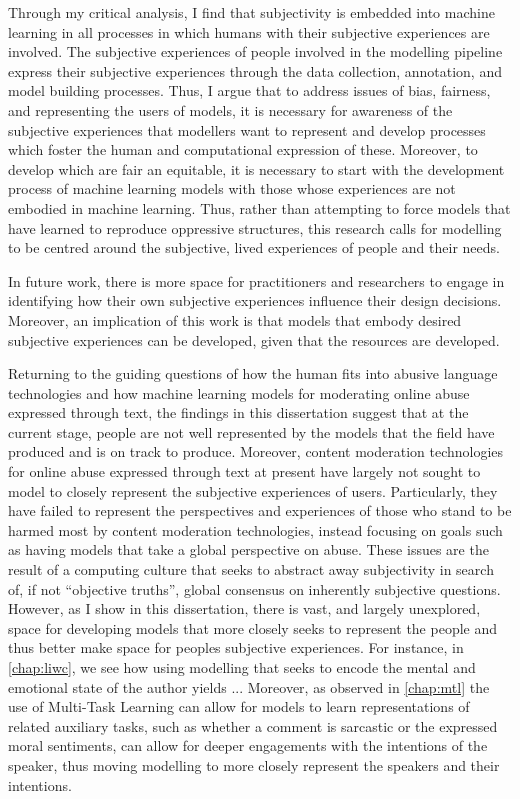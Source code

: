 Through my critical analysis, I find that subjectivity is embedded into machine learning in all processes in which humans with their subjective experiences are involved.
The subjective experiences of people involved in the modelling pipeline express their subjective experiences through the data collection, annotation, and model building processes.
Thus, I argue that to address issues of bias, fairness, and representing the users of models, it is necessary for awareness of the subjective experiences that modellers want to represent and develop processes which foster the human and computational expression of these.
Moreover, to develop which are fair an equitable, it is necessary to start with the development process of machine learning models with those whose experiences are not embodied in machine learning.
Thus, rather than attempting to force models that have learned to reproduce oppressive structures, this research calls for modelling to be centred around the subjective, lived experiences of people and their needs.

In future work, there is more space for practitioners and researchers to engage in identifying how their own subjective experiences influence their design decisions.
Moreover, an implication of this work is that models that embody desired subjective experiences can be developed, given that the resources are developed.

Returning to the guiding questions of how the human fits into abusive language technologies and how machine learning models for moderating online abuse expressed through text, the findings in this dissertation suggest that at the current stage, people are not well represented by the models that the field have produced and is on track to produce.
Moreover, content moderation technologies for online abuse expressed through text at present have largely not sought to model to closely represent the subjective experiences of users.
Particularly, they have failed to represent the perspectives and experiences of those who stand to be harmed most by content moderation technologies, instead focusing on goals such as having models that take a global perspective on abuse.
These issues are the result of a computing culture that seeks to abstract away subjectivity in search of, if not ``objective truths'', global consensus on inherently subjective questions.
However, as I show in this dissertation, there is vast, and largely unexplored, space for developing models that more closely seeks to represent the people and thus better make space for peoples subjective experiences.
For instance, in \cref{chap:liwc}, we see how using modelling that seeks to encode the mental and emotional state of the author yields ... %
Moreover, as observed in \cref{chap:mtl} the use of Multi-Task Learning can allow for models to learn representations of related auxiliary tasks, such as whether a comment is sarcastic or the expressed moral sentiments, can allow for deeper engagements with the intentions of the speaker, thus moving modelling to more closely represent the speakers and their intentions.

